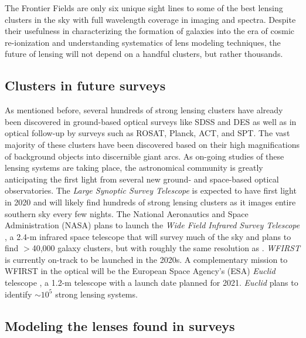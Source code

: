 The Frontier Fields are only six unique sight lines to some of the best lensing clusters in the sky with full wavelength coverage in imaging and spectra. Despite their usefulness in characterizing the formation of galaxies into the era of cosmic re-ionization and understanding systematics of lens modeling techniques, the future of lensing will not depend on a handful clusters, but rather thousands.

\subsection{Clusters in future surveys}

As mentioned before, several hundreds of strong lensing clusters have already been discovered in ground-based optical surveys like SDSS and DES as well as in optical follow-up by surveys such as ROSAT, Planck, ACT, and SPT. The vast majority of these clusters have been discovered based on their high magnifications of background objects into discernible giant arcs. As on-going studies of these lensing systems are taking place, the astronomical community is greatly anticipating the first light from several new ground- and space-based optical observatories. The {\it Large Synoptic Survey Telescope} \citep[{\it LSST}; ][]{IVezic:2008tv} is expected to have first light in 2020 and will likely find hundreds of strong lensing clusters as it images entire southern sky every few nights. The National Aeronautics and Space Administration (NASA) plans to launch the {\it Wide Field Infrared Survey Telescope} \citep[{\it WFIRST}; ][]{Spergel:2013zk}, a 2.4-m infrared space telescope that will survey much of the sky and plans to find $>$40,000 galaxy clusters, but with roughly the same resolution as \hst. {\it WFIRST} is currently on-track to be launched in the 2020s. A complementary mission to WFIRST in the optical will be the European Space Agency's (ESA) {\it Euclid} telescope \citep{Laureijs:2011qt}, a 1.2-m telescope with a launch date planned for 2021. {\it Euclid} plans to identify $\sim10^5$ strong lensing systems.

\subsection{Modeling the lenses found in surveys}

